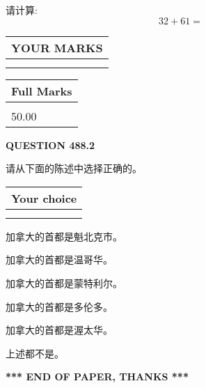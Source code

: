 \documentclass{ctexart}
\begin{document}
  
 
请计算:
\begin{equation}
32 +  %
61 = \nonumber
\end{equation}
 

 

 
  
\vspace{0.2in}
  
\noindent\begin{tabular}{|l|}
\hline
 YOUR MARKS  \\
\hline
 \\ 
 \\ 
\hline
\end{tabular}
\hspace{0.05in} \begin{tabular}{|l|}
\hline
 Full Marks  \\
\hline
 \\ 
50.00 \\
\hline
\end{tabular}
{\textbf{\Large{QUESTION
488.2 
}}}
  
  
请从下面的陈述中选择正确的。
  
  
\noindent\hspace{3.0in} \begin{tabular}{|l|}
\hline
Your choice \\
\hline
 \\ 
 \\ 
\hline
\end{tabular}
  
  
 
 
加拿大的首都是魁北克市。
 
 
加拿大的首都是温哥华。
 
 
加拿大的首都是蒙特利尔。
 
 
加拿大的首都是多伦多。
 
 
加拿大的首都是渥太华。
 
 
 上述都不是。
 
 
   
   
 \vspace{0.2in}
 
   
   
   
   
\vspace{1.0in} 
{\textbf{\large{ *** END OF PAPER, THANKS *** }}} 
   
\end{document}

